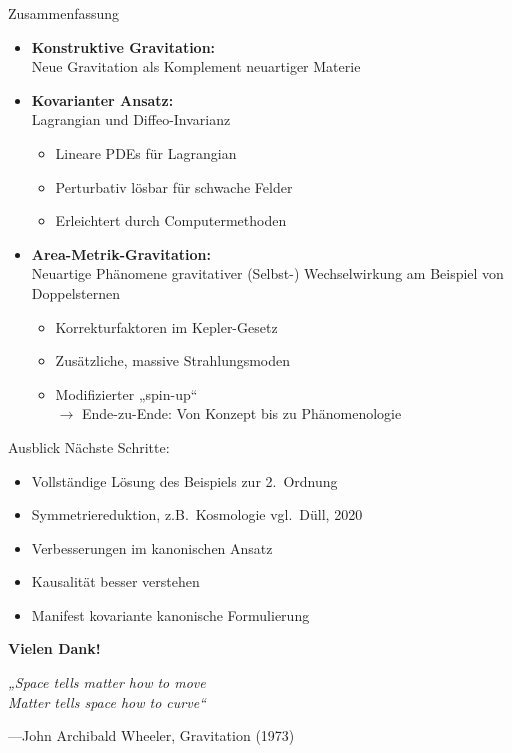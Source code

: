 \documentclass{beamer}
\begin{document}
    \begin{frame}{Zusammenfassung}
        \begin{itemize}
            \item \textbf{Konstruktive Gravitation:} \\ Neue Gravitation als Komplement neuartiger Materie \pause
            \item \textbf{Kovarianter Ansatz:} \\
            Lagrangian und Diffeo-Invarianz
            \begin{itemize}
                \item Lineare PDEs für Lagrangian
                \item Perturbativ lösbar für schwache Felder
                \item Erleichtert durch Computermethoden
            \end{itemize} \pause
            \item \textbf{Area-Metrik-Gravitation:} \\
            Neuartige Phänomene gravitativer (Selbst-) Wechselwirkung am Beispiel von Doppelsternen
            \begin{itemize}
                \item Korrekturfaktoren im Kepler-Gesetz
                \item Zusätzliche, massive Strahlungsmoden
                \item Modifizierter „spin-up“ \pause \\
                \alert{$\rightarrow$ Ende-zu-Ende: Von Konzept bis zu Phänomenologie}
            \end{itemize}
        \end{itemize}
    \end{frame}

    \begin{frame}{Ausblick}
        Nächste Schritte:
        \begin{itemize}
            \item Vollständige Lösung des Beispiels zur 2.\ Ordnung
            \item Symmetriereduktion, z.B.\ Kosmologie {\scriptsize \lbrack vgl.\ Düll, 2020\rbrack}
            \item Verbesserungen im kanonischen Ansatz
            \item Kausalität besser verstehen
            \item Manifest kovariante kanonische Formulierung
        \end{itemize}
    \end{frame}

    \begin{frame}{}
        \begin{center}
            \Huge\alert{\textbf{Vielen Dank!}}
        \end{center}

        \Large
        \textit{„Space tells matter how to move \\
        Matter tells space how to curve“}

        \normalsize
        ---John Archibald Wheeler, Gravitation (1973)
    \end{frame}
\end{document}
